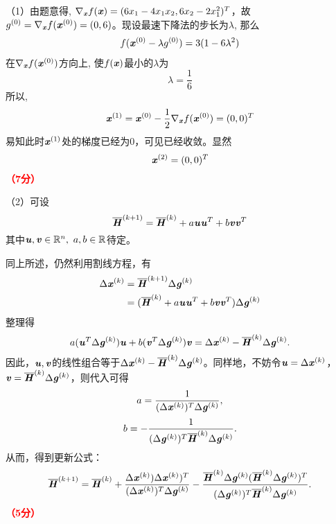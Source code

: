 \documentclass[12pt,a4paper,openany,twoside]{ctexbook}
\begin{document}
\begin{Solution}
	（1）由题意得, $\nabla_{\Vx}f(\Vx) = (6x_1-4x_1x_2, 6x_2-2x_1^2)^T$，故$g^{(0)}=\nabla_{\Vx}f(\Vx^{(0)})=(0, 6)$。现设最速下降法的步长为$\lambda$, 那么
	\begin{align*}
		f(\Vx^{(0)} - \lambda g^{(0)}) = 3(1-6\lambda^2)
	\end{align*}
	在$\nabla_{\Vx} f(\Vx^{(0)})$方向上, 使$f(\Vx)$最小的$\lambda$为
	$$\lambda = \frac{1}{6}$$
	所以,
	$$\Vx^{(1)} = \Vx^{(0)} - \frac{1}{2}\nabla_{\Vx}f(\Vx^{(0)}) = (0, 0)^{T}$$
	易知此时$\Vx^{(1)}$处的梯度已经为0，可见已经收敛。显然
	$$\Vx^{(2)} = (0, 0)^{T}$$
	\hfill \textcolor{red}{\textbf{（7分）}}
	
	（2）可设
	\begin{equation*}
		\overline{\MH}^{(k+1)}=\overline{\MH}^{(k)}+a\Vu\Vu^T+b\Vv\Vv^T
	\end{equation*}
	其中$\Vu,\Vv\in\NR^n,~a,b\in\NR$待定。
	
	同上所述，仍然利用割线方程，有
	\begin{equation*}
		\begin{aligned}
			\Delta\Vx^{(k)}
			& =\overline{\MH}^{(k+1)} \Delta\Vg^{(k)} \\
			& = (\overline{\MH}^{(k)}+a\Vu\Vu^T+b\Vv\Vv^T) \Delta\Vg^{(k)} \\
		\end{aligned}
	\end{equation*}
	整理得
	\[ a(\Vu^T \Delta\Vg^{(k)})\Vu + b(\Vv^T \Delta\Vg^{(k)})\Vv = \Delta\Vx^{(k)} - \overline{\MH}^{(k)} \Delta\Vg^{(k)}. \]
	因此，$\Vu,\Vv$的线性组合等于$\Delta\Vx^{(k)} - \overline{\MH}^{(k)} \Delta\Vg^{(k)}$。同样地，不妨令$\Vu = \Delta\Vx^{(k)}$，$\Vv = \overline{\MH}^{(k)} \Delta\Vg^{(k)}$，则代入可得
	\[ a = \frac{1}{(\Delta\Vx^{(k)})^T \Delta\Vg^{(k)}}, \]
	\[ b = -\frac{1}{(\Delta\Vg^{(k)})^T \overline{\MH}^{(k)} \Delta\Vg^{(k)}}. \]
	从而，得到更新公式：
	\begin{equation*}\label{eq_dfp}
		\overline{\MH}^{(k+1)}=\overline{\MH}^{(k)} + \frac{\Delta\Vx^{(k)}) \Delta\Vx^{(k)})^T}{(\Delta\Vx^{(k)})^T \Delta\Vg^{(k)}} - \frac{\overline{\MH}^{(k)} \Delta\Vg^{(k)} (\overline{\MH}^{(k)} \Delta\Vg^{(k)})^T}{(\Delta\Vg^{(k)})^T \overline{\MH}^{(k)} \Delta\Vg^{(k)}} .
	\end{equation*}
	\hfill \textcolor{red}{\textbf{（5分）}}
\end{Solution}
\end{document}
